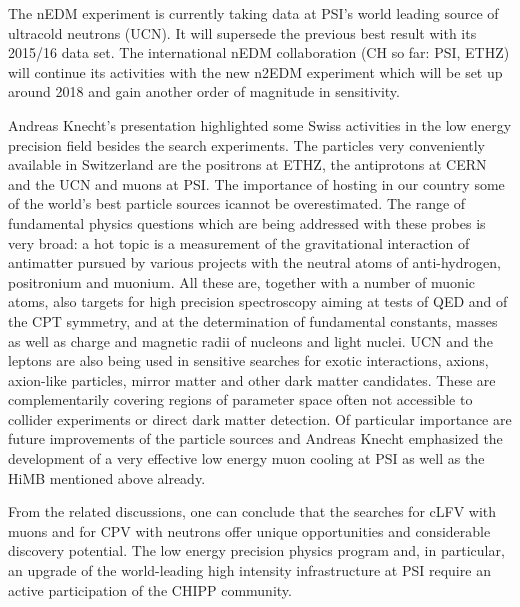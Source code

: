 The nEDM experiment is currently taking data at PSI's world leading
source of ultracold neutrons (UCN). It will supersede the previous
best result with its 2015/16 data set. The international nEDM
collaboration (CH so far: PSI, ETHZ) will continue its activities with
the new n2EDM experiment which will be set up around 2018 and gain
another order of magnitude in sensitivity.

Andreas Knecht's presentation highlighted some Swiss activities in the
low energy precision field besides the search experiments. The
particles very conveniently available in Switzerland are the positrons
at ETHZ, the antiprotons at CERN and the UCN and muons at PSI. 
The importance of hosting in our country some of the world's best particle
sources icannot be overestimated. The range of fundamental physics questions
which are being addressed with these probes is very broad: a hot topic
is a measurement of the gravitational interaction of antimatter
pursued by various projects with the neutral atoms of anti-hydrogen,
positronium and muonium. All these are, together with a number of
muonic atoms, also targets for high precision spectroscopy aiming at
tests of QED and of the CPT symmetry, and at the determination of fundamental
constants, masses as well as charge and magnetic radii of nucleons and light
nuclei. UCN and the leptons are also being used in sensitive searches
for exotic interactions, axions, axion-like particles, mirror matter
and other dark matter candidates. These are complementarily covering
regions of parameter space often not accessible to collider
experiments or direct dark matter detection. Of particular importance
are future improvements of the particle sources and Andreas Knecht
emphasized the development of a very effective low energy muon cooling
at PSI as well as the HiMB mentioned above already.

From the related discussions, one can conclude that the searches for
cLFV with muons and for CPV with neutrons offer unique opportunities
and considerable discovery potential. The low energy precision physics
program and, in particular, an upgrade of the world-leading high
intensity infrastructure at PSI require an active participation of the
CHIPP community.

